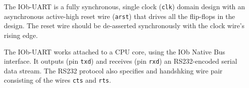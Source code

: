 %

The IOb-UART is a fully synchronous, single clock ({\tt clk}) domain
design with an asynchronous active-high reset wire ({\tt arst}) that drives
all the flip-flops in the design. The reset wire should be de-asserted
synchronously with the clock wire's rising edge.

The IOb-UART works attached to a CPU core, using the IOb Native Bus
interface. It outputs (pin {\tt txd}) and receives (pin {\tt rxd}) an
RS232-encoded serial data stream. The RS232 protocol also specifies and
handshking wire pair consisting of the wires {\tt cts} and {\tt rts}.

